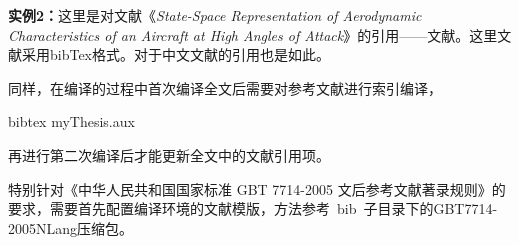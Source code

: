 {\bf{实例2：}}这里是对文献《{\it{State-Space Representation of Aerodynamic Characteristics of an Aircraft at High Angles of Attack}}》的引用——文献\cite{Goman:state_aerodynamics}。这里文献采用bibTex格式。对于中文文献的引用也是如此\cite{BUAA:2002-CFD-missile}。

同样，在编译的过程中首次编译全文后需要对参考文献进行索引编译，

\begin{center}
  {\color{blue}bibtex myThesis.aux}
\end{center}

再进行第二次编译后才能更新全文中的文献引用项。

特别针对《中华人民共和国国家标准 GBT 7714-2005 文后参考文献著录规则》的要求，需要首先配置编译环境的文献模版，方法参考~bib~子目录下的GBT7714-2005NLang压缩包。
